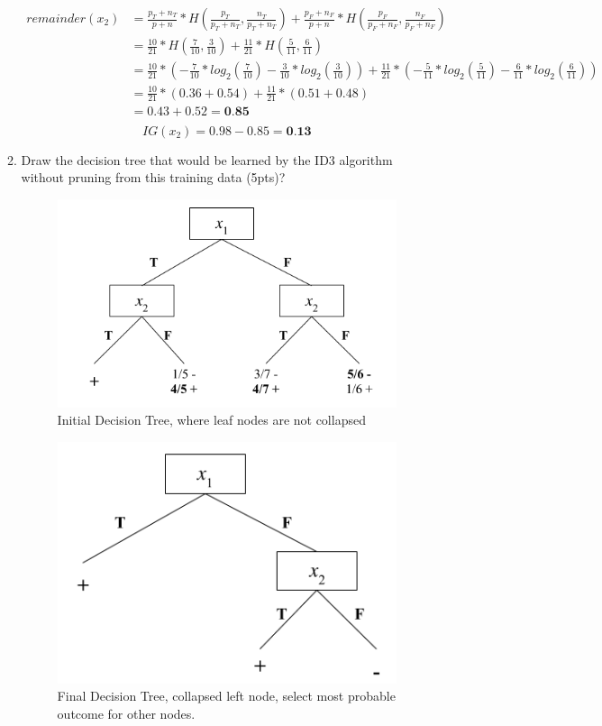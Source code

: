 \documentclass[12pt]{article}
\begin{document}
\begin{enumerate}
\begin{enumerate}
\begin{equation*}
\begin{split}
	remainder(x_2) & = \frac{p_T + n_T}{p + n} * H(\frac{p_T}{p_T+n_T},\frac{n_T}{p_T+n_T}) + 
				      \frac{p_F+n_F}{p+n}*H(\frac{p_F}{p_F+n_F},\frac{n_F}{p_F+n_F})\\
	& = \frac{10}{21}*H(\frac{7}{10},\frac{3}{10}) + \frac{11}{21}*H(\frac{5}{11},\frac{6}{11})\\
	& = \frac{10}{21}*(-\frac{7}{10}*log_{2}(\frac{7}{10})-\frac{3}{10} * log_{2}(\frac{3}{10})) + 
	       \frac{11}{21}*(-\frac{5}{11}*log_{2}(\frac{5}{11})-\frac{6}{11}*log_{2}(\frac{6}{11}))\\
	& = \frac{10}{21}*(0.36+0.54) + \frac{11}{21}*(0.51+0.48)\\
	& = 0.43 + 0.52 = \textbf{0.85}\\
\end{split}
\end{equation*}
\begin{equation*}
	IG(x_{2}) = 0.98 - 0.85 = \textbf{0.13}
\end{equation*}
\hfill\newline
\newpage
\item Draw the decision tree that would be learned by the ID3 algorithm without pruning from this training data (5pts)?
\\
\begin{figure}[h]
\caption{Initial Decision Tree, where leaf nodes are not collapsed}
\includegraphics[width=10cm]{InitialTree}
\centering
\end{figure}
\begin{figure}[h]
\caption{Final Decision Tree, collapsed left node, select most probable outcome for other nodes.}
\includegraphics[width=10cm]{FinalTree}
\centering
\end{figure}
\newpage
\end{enumerate}
	

\end{enumerate}
\end{document}
